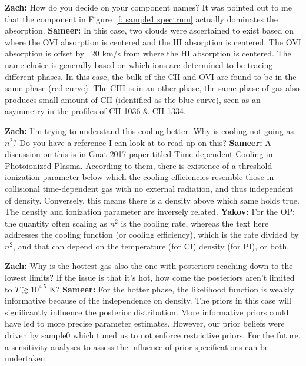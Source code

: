 \documentclass[fleqn,usenatbib]{mnras}
\begin{document}
\textbf{Zach:}
How do you decide on your component names? It was pointed out to me that the  component in Figure~\ref{f: sample1 spectrum} actually dominates the  absorption.
\textbf{Sameer:}
In this case, two clouds were ascertained to exist based on where the OVI absorption is centered and the HI absorption is centered. The OVI absorption is offset by ~20 km/s from where the HI absorption is centered. 
The name choice is generally based on which ions are determined to be tracing different phases. In this case, the bulk of the CII and OVI are found to be in the same phase (red curve). The CIII is in an other phase, the same phase of gas also produces small amount of CII (identified as the blue curve), seen as an asymmetry in the profiles of CII 1036 \& CII 1334.

\textbf{Zach:}
I'm trying to understand this cooling better. Why is cooling not going as $n^2$? Do you have a reference I can look at to read up on this?
\textbf{Sameer:}
A discussion on this is in Gnat 2017 paper titled Time-dependent Cooling in Photoionized Plasma.
According to them, there is existence of a threshold ionization parameter below which the cooling efficiencies resemble those in collisional time-dependent gas with no external radiation, and thus independent of density. 
Conversely, this means there is a density above which same holds true. The density and ionization parameter are inversely related.
\textbf{Yakov:}
For the OP: the quantity often scaling as $n^2$ is the cooling rate, whereas the text here addresses the cooling function (or cooling efficiency), which is the rate divided by $n^2$, and that can depend on the temperature (for CI) density (for PI), or both.

\textbf{Zach:}
Why is the hottest gas also the one with posteriors reaching down to the lowest limits? If the issue is that it's hot, how come the posteriors aren't limited to $T \gtrsim 10^4.5$ K?
\textbf{Sameer:}
For the hotter phase, the likelihood function is weakly informative because of the independence on density. The priors in this case will significantly influence the posterior distribution. More informative priors could have led to more precise parameter estimates. However, our prior beliefs were driven by sample0 which tuned us to not enforce restrictive priors. For the future, a sensitivity analyses to assess the influence of prior specifications can be undertaken.
\end{document}
